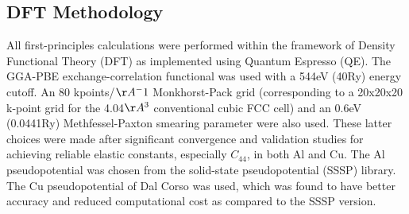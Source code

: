 \documentclass{article}
\begin{document}
\subsection{DFT Methodology} \label{sct:dft_calcsettings_and_methods}

All first-principles calculations were performed within the framework of Density Functional Theory (DFT) as implemented
using Quantum Espresso\cite{Giannozzi2009} (QE).  The GGA-PBE\cite{Perdew1996} exchange-correlation functional was used with a
544eV (40Ry) energy cutoff.  An 80 kpoints/$\AA^-1$ Monkhorst-Pack grid\cite{Pack1977SpecialIntegrations} 
(corresponding to a 20x20x20 k-point grid for the 4.04$\AA^3$ conventional cubic FCC cell) and an 0.6eV (0.0441Ry) Methfessel-Paxton smearing parameter \cite{Methfessel1989High-precisionMetals} were also used.  These latter choices were made after significant convergence and validation studies for achieving reliable elastic constants, especially $C_{44}$, in both Al and Cu.  The Al pseudopotential was chosen from the solid-state pseudopotential (SSSP) library\cite{Prandini2018}.  The Cu pseudopotential of Dal Corso\cite{DalCorso2014} was used, which was found to have better 
accuracy and reduced computational cost as compared to the SSSP version.
\end{document}
